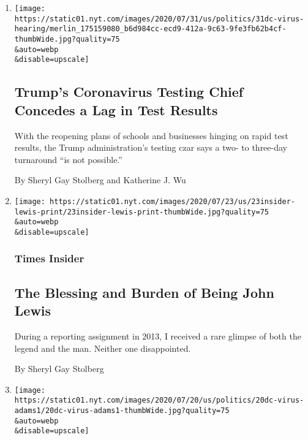 \begin{enumerate}
\def\labelenumi{\arabic{enumi}.}
\item
  \href{/2020/07/31/us/politics/trump-coronavirus-testing.html}{}

  \texttt{[image: https://static01.nyt.com/images/2020/07/31/us/politics/31dc-virus-hearing/merlin\_175159080\_b6d984cc-ecd9-412a-9c63-9fe3fb62b4cf-thumbWide.jpg?quality=75\\\&auto=webp\\\&disable=upscale]}

  \hypertarget{trumps-coronavirus-testing-chief-concedes-a-lag-in-test-results}{%
  \subsection{Trump's Coronavirus Testing Chief Concedes a Lag in Test
  Results}\label{trumps-coronavirus-testing-chief-concedes-a-lag-in-test-results}}

  With the reopening plans of schools and businesses hinging on rapid
  test results, the Trump administration's testing czar says a two- to
  three-day turnaround ``is not possible.''

  By Sheryl Gay Stolberg and Katherine J. Wu
\item
  \href{/2020/07/23/insider/john-lewis-memory.html}{}

  \texttt{[image: https://static01.nyt.com/images/2020/07/23/us/23insider-lewis-print/23insider-lewis-print-thumbWide.jpg?quality=75\\\&auto=webp\\\&disable=upscale]}

  \hypertarget{times-insider}{%
  \subsubsection{Times Insider}\label{times-insider}}

  \hypertarget{the-blessing-and-burden-of-being-john-lewis}{%
  \subsection{The Blessing and Burden of Being John
  Lewis}\label{the-blessing-and-burden-of-being-john-lewis}}

  During a reporting assignment in 2013, I received a rare glimpse of
  both the legend and the man. Neither one disappointed.

  By Sheryl Gay Stolberg
\item
  \href{/2020/07/21/us/politics/jerome-adams-surgeon-general-trump-coronavirus.html}{}

  \texttt{[image: https://static01.nyt.com/images/2020/07/20/us/politics/20dc-virus-adams1/20dc-virus-adams1-thumbWide.jpg?quality=75\\\&auto=webp\\\&disable=upscale]}


\end{enumerate}
